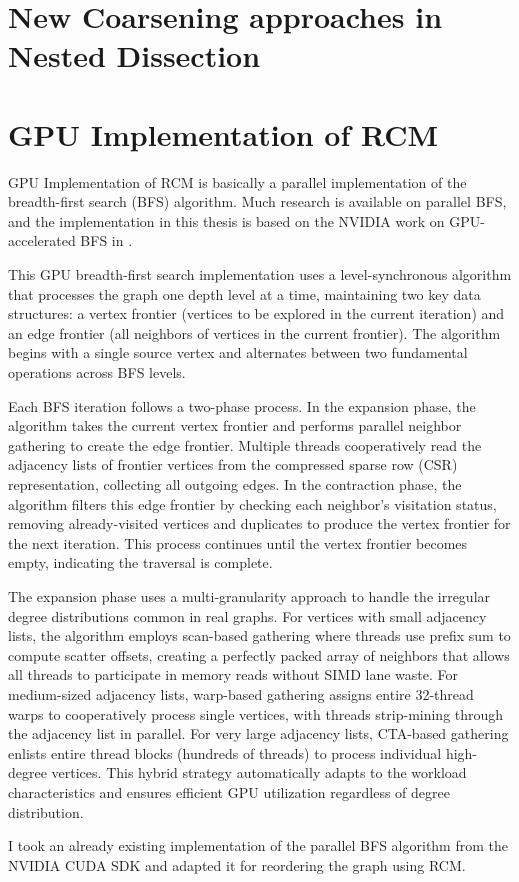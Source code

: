 \newpage
\section{New Coarsening approaches in Nested Dissection}

\section{GPU Implementation of RCM}

GPU Implementation of RCM is basically a parallel implementation of the breadth-first search (BFS) algorithm. Much research is available on parallel BFS, and the implementation in this thesis is based on the NVIDIA work on GPU-accelerated BFS in \cite{merrill_scalable_nodate}.

This GPU breadth-first search implementation uses a level-synchronous algorithm that processes the graph one depth level at a time, maintaining two key data structures: a vertex frontier (vertices to be explored in the current iteration) and an edge frontier (all neighbors of vertices in the current frontier). The algorithm begins with a single source vertex and alternates between two fundamental operations across BFS levels.

Each BFS iteration follows a two-phase process. In the expansion phase, the algorithm takes the current vertex frontier and performs parallel neighbor gathering to create the edge frontier. Multiple threads cooperatively read the adjacency lists of frontier vertices from the compressed sparse row (CSR) representation, collecting all outgoing edges. In the contraction phase, the algorithm filters this edge frontier by checking each neighbor's visitation status, removing already-visited vertices and duplicates to produce the vertex frontier for the next iteration. This process continues until the vertex frontier becomes empty, indicating the traversal is complete.

The expansion phase uses a multi-granularity approach to handle the irregular degree distributions common in real graphs. For vertices with small adjacency lists, the algorithm employs scan-based gathering where threads use prefix sum to compute scatter offsets, creating a perfectly packed array of neighbors that allows all threads to participate in memory reads without SIMD lane waste. For medium-sized adjacency lists, warp-based gathering assigns entire 32-thread warps to cooperatively process single vertices, with threads strip-mining through the adjacency list in parallel. For very large adjacency lists, CTA-based gathering enlists entire thread blocks (hundreds of threads) to process individual high-degree vertices. This hybrid strategy automatically adapts to the workload characteristics and ensures efficient GPU utilization regardless of degree distribution.

I took an already existing implementation of the parallel BFS algorithm from the NVIDIA CUDA SDK \cite{kaleta_kaletapbfs-cuda-gpu_2025} and adapted it for reordering the graph using RCM.
